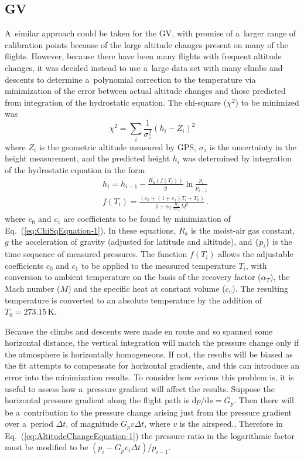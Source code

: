 \documentclass[amtd, online, hvmath]{copernicus}
\begin{document}
\subsection{GV}

A~similar approach could be taken for the GV, with promise of a~larger
range of calibration points because of the large altitude changes
present on many of the flights. However, because there have been many
flights with frequent altitude changes, it was decided instead to use
a~large data set with many climbs and descents to determine
a~polynomial correction to the temperature via minimization of the
error between actual altitude changes and those predicted from
integration of the hydrostatic equation. The chi-square ($\chi^2$) to
be minimized was
\begin{equation}
\chi^2=\sum\limits_i\frac{1}{\sigma_z^2}(h_i-Z_i)^2\label{eq:ChiSqEquation-1}
\end{equation}
where $Z_i$ is the geometric altitude measured by GPS, $\sigma_z$
is the uncertainty in the height measurement, and the predicted height
$h_i$ was determined by integration of the hydrostatic equation
in the form
\begin{align}
&h_i=h_{i-1}-\frac{R_{\mathrm{a}}(f(T_i))}{g}\ln\frac{p_i}{p_{i-1}}\label{eq:AltitudeChangeEquation-1}\\
&f(T_i)=\frac{\left(c_0+(1+c_1)T_i+T_0\right)}{1+\alpha_T\,\frac{R_{\mathrm{a}}}{2C_v}M^2}\,.\label{eq:RecoveryCorrection}
\end{align}
where $c_0$ and $c_1$ are coefficients to be found by minimization of
Eq.~(\ref{eq:ChiSqEquation-1}). In these equations, $R_{\mathrm{a}}$
is the moist-air gas constant, $g$ the acceleration of gravity
(adjusted for latitude and altitude), and $\{p_i\}$ is the time
sequence of measured pressures. The function $f(T_i)$ allows the
adjustable coefficients $c_0$ and $c_1$ to be applied to the measured
temperature $T_i$, with conversion to ambient temperature on the basis
of the recovery factor ($\alpha_T$), the Mach number ($M$)
and the specific heat at constant volume ($c_v$). The resulting
temperature is converted to an absolute temperature by the addition of
$T_0=273.15$\,\unit{K}.

Because the climbs and descents were made en route and so spanned some
horizontal distance, the vertical integration will match the pressure
change only if the atmosphere is horizontally homogeneous.  If not,
the results will be biased as the fit attempts to compensate for
horizontal gradients, and this can introduce an error into the
minimization results. To consider how serious this problem is, it is
useful to assess how a~pressure gradient will affect the results.
Suppose the horizontal pressure gradient along the flight path is
$\mathrm{d}p/\mathrm{d}s=G_p$. Then there will be a~contribution to the
pressure change arising just from the pressure gradient over a~period
$\Delta t$, of magnitude $G_pv\Delta t$, where $v$ is the
airspeed., Therefore in Eq.~(\ref{eq:AltitudeChangeEquation-1}) the
pressure ratio in the logarithmic factor must be modified to be
$(p_i-G_pv_i\Delta t)/p_{i-1}$.
\end{document}
